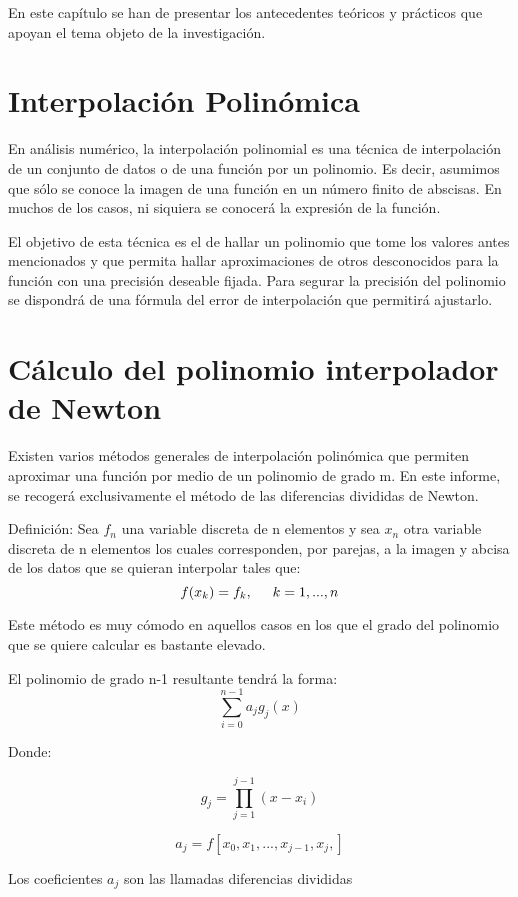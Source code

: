 

En este capítulo se han de presentar los antecedentes teóricos y prácticos que
apoyan el tema objeto de la investigación.


\section{Interpolación Polinómica}
\label{2:sec:1}
En análisis numérico, la interpolación polinomial es una técnica de interpolación de un conjunto de datos o de una función por un polinomio. Es decir, asumimos que sólo se conoce la imagen de una función en un número finito de abscisas. En muchos de los casos, ni siquiera se conocerá la expresión de la función.\par El objetivo de esta técnica es el de hallar un polinomio que tome los valores antes mencionados y que permita hallar aproximaciones de otros desconocidos para la función con una precisión deseable fijada. Para segurar la precisión del polinomio se dispondrá de una fórmula del error de interpolación que permitirá ajustarlo.

\section{Cálculo del polinomio interpolador de Newton}
\label{2:sec:2}
  Existen varios métodos generales de interpolación polinómica que permiten aproximar una función por medio de un polinomio de grado m. En este informe, se recogerá exclusivamente el método de las diferencias divididas de Newton.\par Definición: Sea $f_{n}$  una variable discreta de n  elementos y sea $x_{n}$ otra variable discreta de n elementos los cuales corresponden, por parejas, a la imagen y abcisa de los datos que se quieran interpolar tales que:
  \[f(x_{k})=f_{k}, \hspace{0.5 cm} k=1,...,n\]\par
  Este método es muy cómodo en aquellos casos en los que el grado del polinomio que se quiere calcular es bastante elevado.\par El polinomio de grado n-1  resultante tendrá la forma:
  \[\sum_{i=0}^{n-1} {a_j}{g_j}(x)\]\par Donde:\par \[ g_{j}=\prod_{j=1}^{j-1}{(x-x_{i})}\]\par
  \[ a_{j}=f[x_{0},x_{1},...,x_{j-1},x_{j},]\]\par Los coeficientes $a_{j}$ son las llamadas diferencias divididas